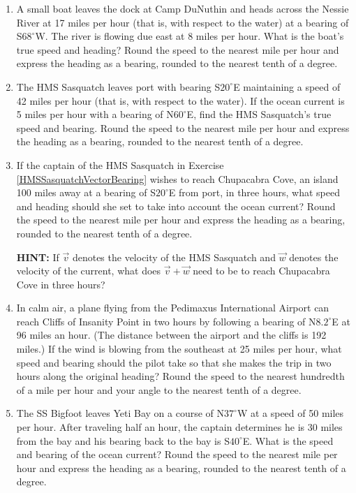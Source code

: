 \begin{enumerate}

\setcounter{enumi}{\value{HW}}

\item A small boat leaves the dock at Camp DuNuthin and heads across the Nessie River at 17 miles per hour (that is, with respect to the water) at a bearing of  S$68^{\circ}$W.   The river is flowing due east at 8 miles per hour.  What is the boat's true speed and heading?  Round the speed to the nearest mile per hour and express the heading as a bearing, rounded to the nearest tenth of a degree.  

\item \label{HMSSasquatchVectorBearing} The HMS Sasquatch leaves port with bearing S$20^{\circ}$E maintaining a speed of 42 miles per hour (that is, with respect to the water).  If the ocean current is 5 miles per hour with a bearing of N$60^{\circ}$E, find the HMS Sasquatch's true speed and bearing.  Round the speed to the nearest mile per hour and express the heading as a bearing, rounded to the nearest tenth of a degree. 

\item If the captain of the HMS Sasquatch in Exercise \ref{HMSSasquatchVectorBearing} wishes to reach Chupacabra Cove, an island 100 miles away at a bearing of  S$20^{\circ}$E from port, in three hours, what speed and heading should she set to take into account the ocean current?   Round the speed to the nearest mile per hour and express the heading as a bearing, rounded to the nearest tenth of a degree.  

\textbf{HINT:}  If $\vec{v}$ denotes the velocity of the HMS Sasquatch and $\vec{w}$ denotes the velocity of the current, what does $\vec{v} + \vec{w}$ need to be to reach Chupacabra Cove in three hours?

\item In calm air, a plane flying from the Pedimaxus International Airport can reach Cliffs of Insanity Point in two hours by following a bearing of N$8.2^{\circ}$E at 96 miles an hour.  (The distance between the airport and the cliffs is 192 miles.)  If the wind is blowing from the southeast at 25 miles per hour, what speed and bearing should the pilot take so that she makes the trip in two hours along the original heading?  Round the speed to the nearest hundredth of a mile per hour and your angle to the nearest tenth of a degree.

\item  The SS Bigfoot leaves Yeti Bay on a course of N$37^{\circ}$W at a speed of 50 miles per hour.  After traveling half an hour, the captain determines he is 30 miles from the bay and his bearing back to the bay is S$40^{\circ}$E.  What is the speed and bearing of the ocean current?  Round the speed to the nearest mile per hour and express the heading as a bearing, rounded to the nearest tenth of a degree.  


\end{enumerate}
